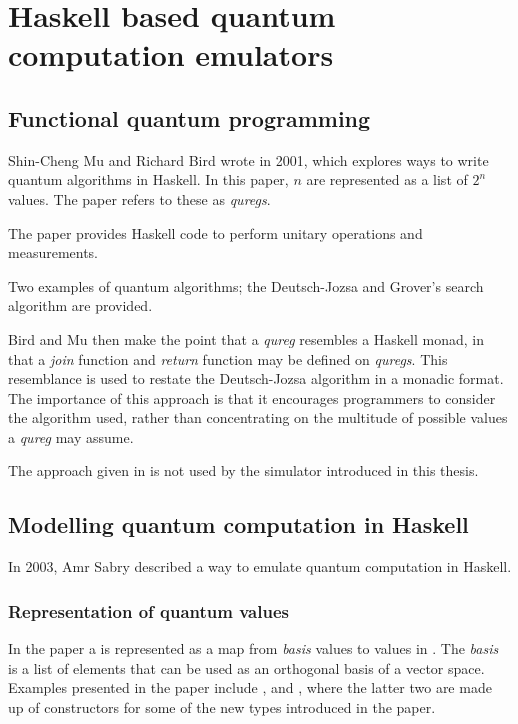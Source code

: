 \section{Haskell based quantum computation emulators}
\label{sec:haskellemulators}
\subsection{Functional quantum programming}
Shin-Cheng Mu and Richard Bird wrote 
\cite{MuBird2001:Functionalquantumprogramming} in 2001, which
explores ways to write quantum algorithms in Haskell. In this paper,
$n$ \qbits{} are represented as a list of $2^n$ values. The paper refers
to these as \emph{quregs}.

The paper provides Haskell code to perform unitary operations and measurements.

Two examples of quantum algorithms; the Deutsch-Jozsa and Grover's search
algorithm are provided.

Bird and Mu then make the point that a \emph{qureg} resembles a 
Haskell monad, in that a \emph{join} function and \emph{return} 
function may be defined on \emph{quregs}. This resemblance is used 
to restate the Deutsch-Jozsa algorithm in a monadic format. The importance
of this approach is that it encourages programmers to consider the 
algorithm used, rather than concentrating on the multitude of possible
values a \emph{qureg} may assume.

The approach given in \cite{MuBird2001:Functionalquantumprogramming}
 is not used by the simulator introduced in this
thesis.

\subsection{Modelling quantum computation in Haskell}
In 2003, Amr Sabry \cite{sabry03:qcinH} described a way
to emulate quantum computation in Haskell.

\subsubsection{Representation of quantum values}
In the paper a \qbit{} is represented as a map from \emph{basis} values 
to values in \complex. The \emph{basis}
 is a list of elements that can be used as
an orthogonal basis of a vector space. Examples presented in the paper include
, \inlhskl{[Up,Down]} and \inlhskl{[Red,}
  \inlhskl{Blue]}, 
where the latter two
are made up of constructors for some of the 
new types introduced in the paper. 


